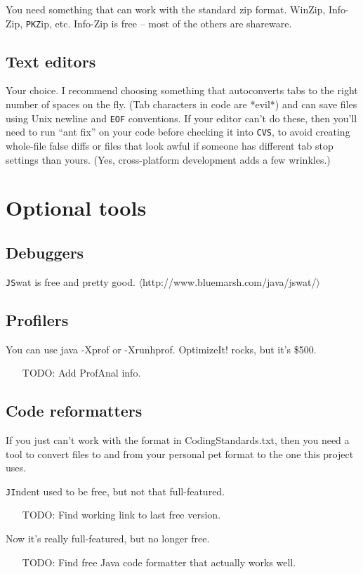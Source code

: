 \documentclass{article}
\begin{document}
You need something that can work with the standard zip format.  WinZip, 
Info-Zip, \texttt{PKZ}ip, etc.  Info-Zip is free -- most of the others are shareware.  

\subsection{Text editors}

Your choice.  I recommend choosing something that autoconverts tabs to
the right number of spaces on the fly.  (Tab characters in code are *evil*)
and can save files using Unix newline and \texttt{EOF} conventions.  If your editor 
can't do these, then you'll need to run ``ant fix'' on your code before 
checking it into \texttt{CVS}, to avoid creating whole-file false diffs or files
that look awful if someone has different tab stop settings than yours.
(Yes, cross-platform development adds a few wrinkles.)


\section{Optional tools}

\subsection{Debuggers}

\texttt{JS}wat is free and pretty good.
$\langle$http://www.bluemarsh.com/java/jswat/$\rangle$

\subsection{Profilers}

You can use java -Xprof or -Xrunhprof.
OptimizeIt! rocks, but it's \$500.
\begin{itemize}
\item[TODO:]  Add ProfAnal info.
\end{itemize}

\subsection{Code reformatters}

If you just can't work with the format in CodingStandards.txt, then you
need a tool to convert files to and from your personal pet format to the
one this project uses.

\texttt{JI}ndent used to be free, but not that full-featured.  
\begin{itemize}
\item[TODO:]  Find working link to last free version.
\end{itemize}
Now it's really full-featured, but no longer free.
\begin{itemize}
\item[TODO:]  Find free Java code formatter that actually works well.
\end{itemize}
\end{document}
